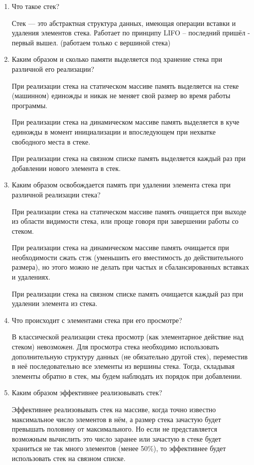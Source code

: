 \begin{enumerate}
	\item Что такое стек?
	
Стек --- это абстрактная структура данных, имеющая операции вставки и удаления элементов стека. Работает по принципу LIFO  --  последний пришёл - первый вышел. (работаем только с вершиной стека)

	\item Каким образом и сколько памяти выделяется под хранение стека при различной его реализации?
	
При реализации стека на статическом массиве память выделяется на стеке  (машинном)  единожды  и  никак  не  меняет  свой  размер  во  время работы программы. 

При реализации стека на динамическом массиве память выделяется в куче единожды в момент инициализации и впоследующем при нехватке свободного места в стеке. 

При реализации стека на связном списке память выделяется каждый раз при добавлении нового элемента в стек.

	\item Каким образом освобождается память при удалении элемента стека при различной реализации стека?
	
При реализации стека на статическом массиве память очищается при выходе из области видимости стека,  или проще говоря при завершении работы со стеком. 

При реализации стека на динамическом массиве память очищается при необходимости сжать стэк (уменьшить его вместимость до действительного размера), но этого можно не делать при частых и сбалансированных вставках и удалениях. 

При реализации стека на связном списке память очищается каждый раз при удалении элемента из стека.

	\item Что происходит с элементами стека при его просмотре? 
	
В  классической  реализации  стека  просмотр  (как  элементарное действие  над  стеком)  невозможен.  Для  просмотра  стека  необходимо использовать  дополнительную  структуру  данных  (не  обязательно  другой стек), переместив в неё последовательно все элементы из вершины стека. Тогда, складывая элементы обратно в стек, мы будем наблюдать их порядок при добавлении.

	\item Каким образом эффективнее реализовывать стек?
	
Эффективнее реализовывать стек на массиве, когда точно известно максимальное  число  элементов  в  нём,  а  размер  стека  зачастую  будет превышать  половину  от  максимального.  Но  если  не  представляется возможным  вычислить  это  число  заранее  или  зачастую  в  стеке  будет храниться  не  так  много  элементов  (менее  50\%),  то  эффективнее  будет использовать стек на связном списке.
\end{enumerate}
